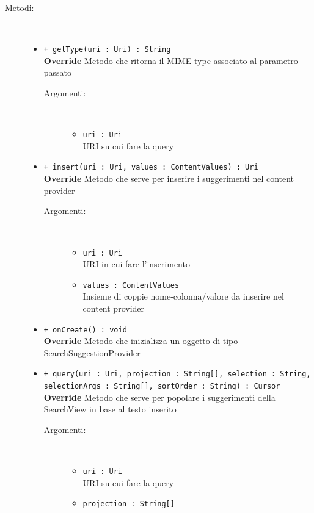 \documentclass[../DefinizioneDiProdotto.tex]{subfiles}
\begin{document}
\begin{description}
\begin{itemize}
	\end{itemize}
	\item[Metodi:] \
	\begin{itemize}
		\item \texttt{+ getType(uri : Uri) : String}\\
		\textbf{Override} Metodo che ritorna il MIME type associato al parametro passato
		\begin{description}
			\item[Argomenti:] \
			\begin{itemize}
				\item \texttt{uri : Uri}\\
				URI su cui fare la query\end{itemize}
		\end{description}
		\item \texttt{+ insert(uri : Uri, values : ContentValues) : Uri}\\
		\textbf{Override} Metodo che serve per inserire i suggerimenti nel content provider
		\begin{description}
			\item[Argomenti:] \
			\begin{itemize}
				\item \texttt{uri : Uri}\\
				URI in cui fare l'inserimento\item \texttt{values : ContentValues}\\
				Insieme di coppie nome-colonna/valore da inserire nel content provider \end{itemize}
		\end{description}
		\item \texttt{+ onCreate() : void}\\
		\textbf{Override} Metodo che inizializza un oggetto di tipo SearchSuggestionProvider
		\item \texttt{+ query(uri : Uri, projection : String[], selection : String, selectionArgs : String[], sortOrder : String) : Cursor}\\
		\textbf{Override} Metodo che serve per popolare i suggerimenti della SearchView in base al testo inserito
		\begin{description}
			\item[Argomenti:] \
			\begin{itemize}
				\item \texttt{uri : Uri}\\
				URI su cui fare la query\item \texttt{projection : String[]}\\

\end{itemize}
\end{description}
\end{itemize}
\end{description}
\end{document}
